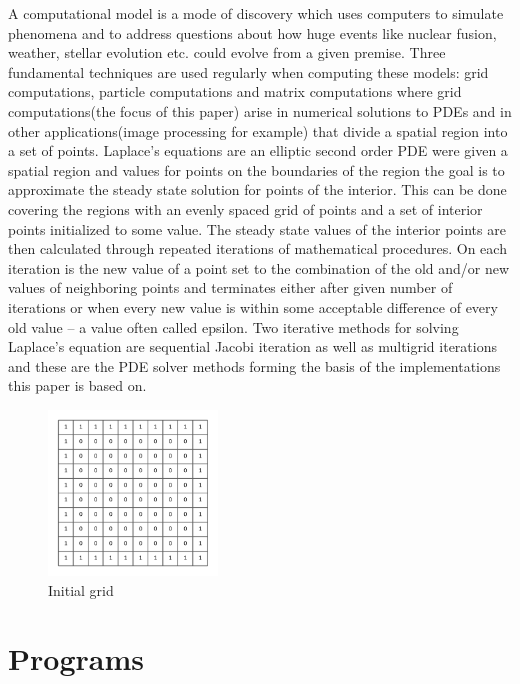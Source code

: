 \documentclass{article}
\begin{document}
A computational model is a mode of discovery which uses computers to simulate phenomena and to address questions about how huge events like nuclear fusion, weather, stellar evolution etc. could evolve from a given premise. Three fundamental techniques are used regularly when computing these models: grid computations, particle computations and matrix computations where grid computations(the focus of this paper) arise in numerical solutions to PDEs and in other applications(image processing for example) that divide a spatial region into a set of points. Laplace’s equations are an elliptic second order PDE were given a spatial region and values for points on the boundaries of the region the goal is to approximate the steady state solution for points of the interior. This can be done covering the regions with an evenly spaced grid of points and a set of interior points initialized to some value. The steady state values of the interior points are then calculated through repeated iterations of mathematical procedures. On each iteration is the new value of a point set to the combination of the old and/or new values of neighboring points and terminates either after given number of iterations or when every new value is within some acceptable difference of every old value – a value often called epsilon. Two iterative methods for solving Laplace’s equation are sequential Jacobi iteration as well as multigrid iterations and these are the PDE solver methods forming the basis of the implementations this paper is based on. 

\begin{figure}
    \includegraphics[width=0.4\textwidth]{../images/grid.png}
    \caption{Initial grid}
    \label{grid}
\end{figure}
\newpage

\section{Programs}\label{programs}
\end{document}
